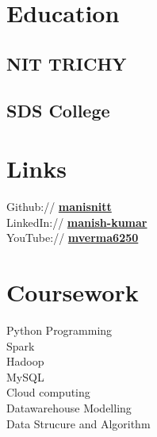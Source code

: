 \documentclass[]{deedy-resume-openfont}
\begin{document}
\begin{minipage}[t]{0.33\textwidth}

\section{Education} 

\subsection{NIT TRICHY}
\sectionsep

\subsection{SDS College}
\sectionsep





\section{Links} 

Github:// \href{https://github.com/manisnitt}{\bf manisnitt} \\
LinkedIn://  \href{https://www.linkedin.com/in/manish-kumar-373b86176/}{\bf manish-kumar} \\
YouTube://  \href{https://www.youtube.com/channel/UCacvJAgrPTjSEdnZObMzpqQ}{\bf mverma6250} \\







\section{Coursework}
Python Programming\\
Spark\\
Hadoop\\
MySQL\\
Cloud computing\\
Datawarehouse Modelling\\
Data Strucure and Algorithm\\



\end{minipage}
\end{document}
